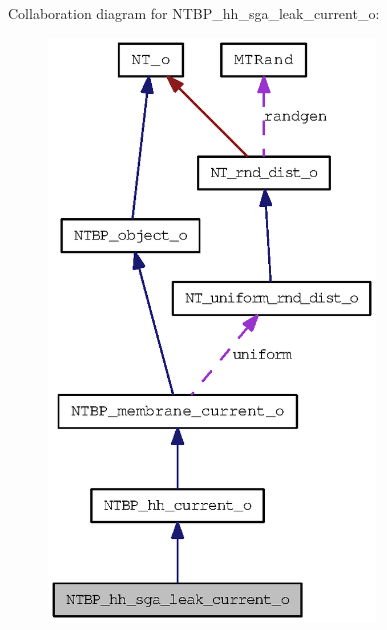 Collaboration diagram for NTBP\_\-hh\_\-sga\_\-leak\_\-current\_\-o:
\nopagebreak
\begin{figure}[H]
\begin{center}
\leavevmode
\includegraphics[width=246pt]{class_n_t_b_p__hh__sga__leak__current__o__coll__graph}
\end{center}
\end{figure}
